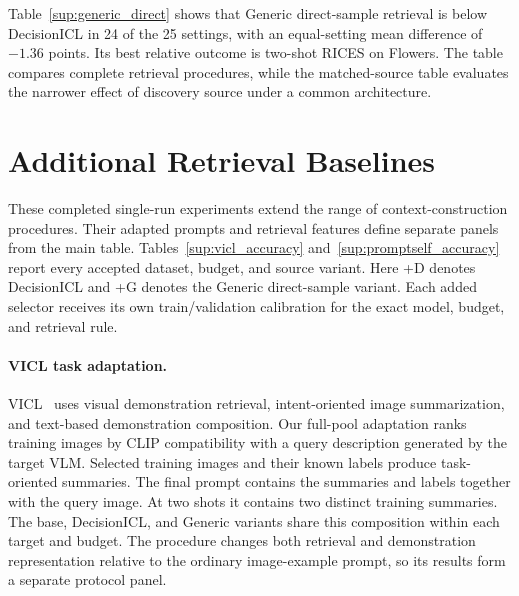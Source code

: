 \documentclass[10pt,twocolumn,letterpaper]{article}
\newcommand{\method}{DecisionICL\xspace}
\begin{document}
Table~\ref{sup:generic_direct} shows that Generic direct-sample retrieval is below \method in 24 of the 25 settings, with an equal-setting mean difference of $-1.36$ points. Its best relative outcome is two-shot RICES on Flowers. The table compares complete retrieval procedures, while the matched-source table evaluates the narrower effect of discovery source under a common architecture.


\section{Additional Retrieval Baselines}
\label{sup:additional}
These completed single-run experiments extend the range of context-construction procedures. Their adapted prompts and retrieval features define separate panels from the main table. Tables~\ref{sup:vicl_accuracy} and~\ref{sup:promptself_accuracy} report every accepted dataset, budget, and source variant. Here +D denotes DecisionICL and +G denotes the Generic direct-sample variant. Each added selector receives its own train/validation calibration for the exact model, budget, and retrieval rule.

\paragraph{VICL task adaptation.}
VICL~\cite{vicl} uses visual demonstration retrieval, intent-oriented image summarization, and text-based demonstration composition. Our full-pool adaptation ranks training images by CLIP compatibility with a query description generated by the target VLM. Selected training images and their known labels produce task-oriented summaries. The final prompt contains the summaries and labels together with the query image. At two shots it contains two distinct training summaries. The base, DecisionICL, and Generic variants share this composition within each target and budget. The procedure changes both retrieval and demonstration representation relative to the ordinary image-example prompt, so its results form a separate protocol panel.
\end{document}
